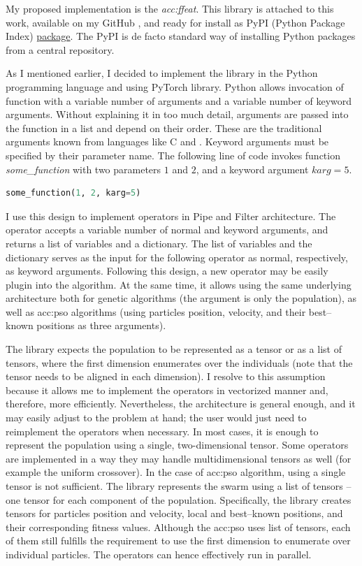My proposed implementation is the \emph{\acrfull{acc:ffeat}}. This library is attached to this work, available on my GitHub \citep{FFEATrepo}, and ready for install as PyPI (Python Package Index) \href{https://pypi.org/project/FFEAT/}{package}. The PyPI is de facto standard way of installing Python packages from a central repository.

As I mentioned earlier, I decided to implement the library in the Python programming language and using PyTorch library. Python allows invocation of function with a variable number of arguments and a variable number of keyword arguments. Without explaining it in too much detail, arguments are passed into the function in a list and depend on their order. These are the traditional arguments known from languages like C and \cppns. Keyword arguments must be specified by their parameter name. The following line of code invokes function \textit{some\_function} with two parameters $1$ and $2$, and a keyword argument $karg=5$.

\begin{lstlisting}[language=Python]
some_function(1, 2, karg=5)
\end{lstlisting}

I use this design to implement operators in Pipe and Filter architecture. The operator accepts a variable number of normal and keyword arguments, and returns a list of variables and a dictionary. The list of variables and the dictionary serves as the input for the following operator as normal, respectively, as keyword arguments. Following this design, a new operator may be easily plug\-in into the algorithm. At the same time, it allows using the same underlying architecture both for genetic algorithms (the argument is only the population), as well as \acrshort{acc:pso} algorithms (using particles position, velocity, and their best--known positions as three arguments).

The library expects the population to be represented as a tensor or as a list of tensors, where the first dimension enumerates over the individuals (note that the tensor needs to be aligned in each dimension). I resolve to this assumption because it allows me to implement the operators in vectorized manner and, therefore, more efficiently. Nevertheless, the architecture is general enough, and it may easily adjust to the problem at hand; the user would just need to reimplement the operators when necessary. In most cases, it is enough to represent the population using a single, two-dimensional tensor. Some operators are implemented in a way they may handle multidimensional tensors as well (for example the uniform crossover). In the case of \acrshort{acc:pso} algorithm, using a single tensor is not sufficient. The library represents the swarm using a list of tensors -- one tensor for each component of the population. Specifically, the library creates tensors for particles position and velocity, local and best--known positions, and their corresponding fitness values. Although the \acrshort{acc:pso} uses list of tensors, each of them still fulfills the requirement to use the first dimension to enumerate over individual particles. The operators can hence effectively run in parallel.

